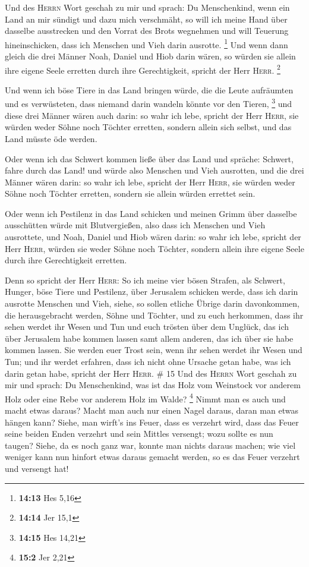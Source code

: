  Und des \textsc{Herrn} Wort geschah zu mir und sprach:
 Du Menschenkind, wenn ein Land an mir sündigt und dazu
mich verschmäht, so will ich meine Hand über dasselbe ausstrecken und
den Vorrat des Brots wegnehmen und will Teuerung hineinschicken, dass
ich Menschen und Vieh darin ausrotte. \footnote{\textbf{14:13} Hes 5,16}
 Und wenn dann gleich die drei Männer Noah, Daniel und
Hiob darin wären, so würden sie allein ihre eigene Seele erretten durch
ihre Gerechtigkeit, spricht der Herr \textsc{Herr}. \footnote{\textbf{14:14}
  Jer 15,1}

 Und wenn ich böse Tiere in das Land bringen würde, die
die Leute aufräumten und es verwüsteten, dass niemand darin wandeln
könnte vor den Tieren, \footnote{\textbf{14:15} Hes 14,21}
 und diese drei Männer wären auch darin: so wahr ich
lebe, spricht der Herr \textsc{Herr}, sie würden weder Söhne noch
Töchter erretten, sondern allein sich selbst, und das Land müsste öde
werden.

 Oder wenn ich das Schwert kommen ließe über das Land und
spräche: Schwert, fahre durch das Land! und würde also Menschen und Vieh
ausrotten,  und die drei Männer wären darin: so wahr ich
lebe, spricht der Herr \textsc{Herr}, sie würden weder Söhne noch
Töchter erretten, sondern sie allein würden errettet sein.

 Oder wenn ich Pestilenz in das Land schicken und meinen
Grimm über dasselbe ausschütten würde mit Blutvergießen, also dass ich
Menschen und Vieh ausrottete,  und Noah, Daniel und Hiob
wären darin: so wahr ich lebe, spricht der Herr \textsc{Herr}, würden
sie weder Söhne noch Töchter, sondern allein ihre eigene Seele durch
ihre Gerechtigkeit erretten.

 Denn so spricht der Herr \textsc{Herr}: So ich meine
vier bösen Strafen, als Schwert, Hunger, böse Tiere und Pestilenz, über
Jerusalem schicken werde, dass ich darin ausrotte Menschen und Vieh,
 siehe, so sollen etliche Übrige darin davonkommen, die
herausgebracht werden, Söhne und Töchter, und zu euch herkommen, dass
ihr sehen werdet ihr Wesen und Tun und euch trösten über dem Unglück,
das ich über Jerusalem habe kommen lassen samt allem anderen, das ich
über sie habe kommen lassen.  Sie werden euer Trost sein,
wenn ihr sehen werdet ihr Wesen und Tun; und ihr werdet erfahren, dass
ich nicht ohne Ursache getan habe, was ich darin getan habe, spricht der
Herr \textsc{Herr}. \# 15  Und des \textsc{Herrn} Wort
geschah zu mir und sprach:  Du Menschenkind, was ist das
Holz vom Weinstock vor anderem Holz oder eine Rebe vor anderem Holz im
Walde? \footnote{\textbf{15:2} Jer 2,21}  Nimmt man es
auch und macht etwas daraus? Macht man auch nur einen Nagel daraus,
daran man etwas hängen kann?  Siehe, man wirft's ins
Feuer, dass es verzehrt wird, dass das Feuer seine beiden Enden verzehrt
und sein Mittles versengt; wozu sollte es nun taugen? 
Siehe, da es noch ganz war, konnte man nichts daraus machen; wie viel
weniger kann nun hinfort etwas daraus gemacht werden, so es das Feuer
verzehrt und versengt hat!

